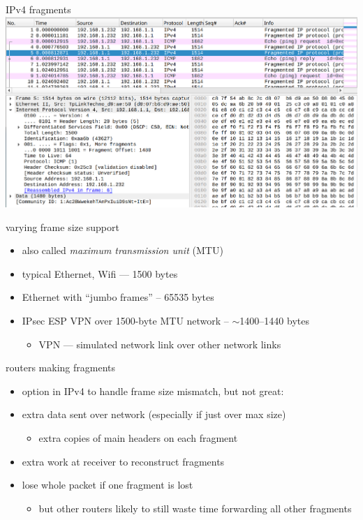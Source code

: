 \begin{frame}{IPv4 fragments}
\includegraphics[width=\textwidth]{../routing/ipv4-fragment-ex}
\end{frame}

\begin{frame}{varying frame size support}
    \begin{itemize}
    \item also called \textit{maximum transmission unit} (MTU)
    \vspace{.5cm}
    \item typical Ethernet, Wifi --- 1500 bytes
    \item Ethernet with ``jumbo frames'' -- 65535 bytes
    \item IPsec ESP VPN over 1500-byte MTU network -- $\sim$1400--1440 bytes
        \begin{itemize}
        \item VPN --- simulated network link over other network links
        \end{itemize}
    \end{itemize}
\end{frame}

\begin{frame}{routers making fragments}
    \begin{itemize}
    \item option in IPv4 to handle frame size mismatch, but not great:
    \vspace{.5cm}
    \item extra data sent over network (especially if just over max size)
        \begin{itemize}
        \item extra copies of main headers on each fragment
        \end{itemize}
    \item extra work at receiver to reconstruct fragments
    \item lose whole packet if one fragment is lost
        \begin{itemize}
        \item but other routers likely to still waste time forwarding all other fragments
        \end{itemize}
    \end{itemize}
\end{frame}

